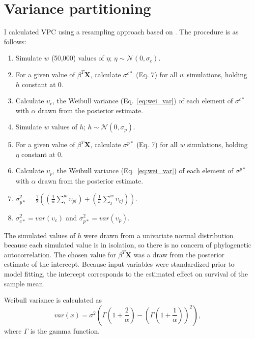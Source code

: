 \documentclass{article}
\begin{document}
\section{Variance partitioning}
I calculated VPC using a resampling approach based on \cite{Goldstein2002}. The procedure is as follows:
\begin{enumerate}
  \item Simulate \(w\) (50,000) values of \(\eta\); \(\eta \sim \mathcal{N}(0, \sigma_{c})\).
  \item For a given value of \(\beta^{T} \mathbf{X}\), calculate \(\sigma^{c*}\) (Eq. 7) for all \(w\) simulations, holding \(h\) constant at 0.
  \item Calculate \(\upsilon_{c}\), the Weibull variance (Eq.~\ref{eq:wei_var}) of each element of \(\sigma^{c*}\) with \(\alpha\) drawn from the posterior estimate.
  \item Simulate \(w\) values of \(h\); \(h \sim \mathcal{N}(0, \sigma_{p})\). 
  \item For a given value of \(\beta^{T} \mathbf{X}\), calculate \(\sigma^{p*}\) (Eq. 7) for all \(w\) simulations, holding \(\eta\) constant at 0.
  \item Calculate \(\upsilon_{p}\), the Weibull variance (Eq.~\ref{eq:wei_var}) of each element of \(\sigma^{p*}\) with \(\alpha\) drawn from the posterior estimate.
  \item \(\sigma_{y*}^{2} = \frac{1}{2} \left(\left(\frac{1}{w} \sum_{i}^{w} \upsilon_{pi}\right) + \left(\frac{1}{w} \sum_{j}^{w} \upsilon_{cj}\right)\right)\).
  \item \(\sigma_{c*}^{2} = var(\upsilon_{c})\) and \(\sigma_{p*}^{2} = var(\upsilon_{p})\).
\end{enumerate}

The simulated values of \(h\) were drawn from a univariate normal distribution because each simulated value is in isolation, so there is no concern of phylogenetic autocorrelation. The chosen value for \(\beta^{T} \mathbf{X}\) was a draw from the posterior estimate of the intercept. Because input variables were standardized prior to model fitting, the intercept corresponds to the estimated effect on survival of the sample mean.

Weibull variance is calculated as
\begin{equation}
  var(x) = \sigma^{2}\left(\Gamma\left(1 + \frac{2}{\alpha}\right) - \left(\Gamma\left(1 + \frac{1}{\alpha}\right)\right)^{2}\right),
  \label{eq:wei_var} \end{equation}
where \(\Gamma\) is the gamma function. 
\end{document}

